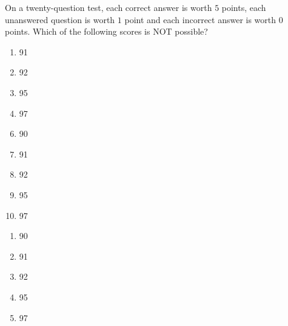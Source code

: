 On a twenty-question test, each correct answer is worth $5$ points, each unanswered question is worth $1$ point and each incorrect answer is worth $0$ points. Which of the following scores is NOT possible?


\ifsat
	\begin{enumerate}[label=\Alph*)]
		\item 91
		\item 92
		\item 95
		\item 97%
	\end{enumerate}
\else
\fi

\ifacteven
	\begin{enumerate}[label=\textbf{\Alph*.},itemsep=\fill,align=left]
		\setcounter{enumii}{5}
		\item 90
		\item 91
		\item 92
		\addtocounter{enumii}{1}
		\item 95
		\item 97%
	\end{enumerate}
\else
\fi

\ifactodd
	\begin{enumerate}[label=\textbf{\Alph*.},itemsep=\fill,align=left]
		\item 90
		\item 91
		\item 92
		\item 95
		\item 97%
	\end{enumerate}
\else
\fi

%

\else
\fi

